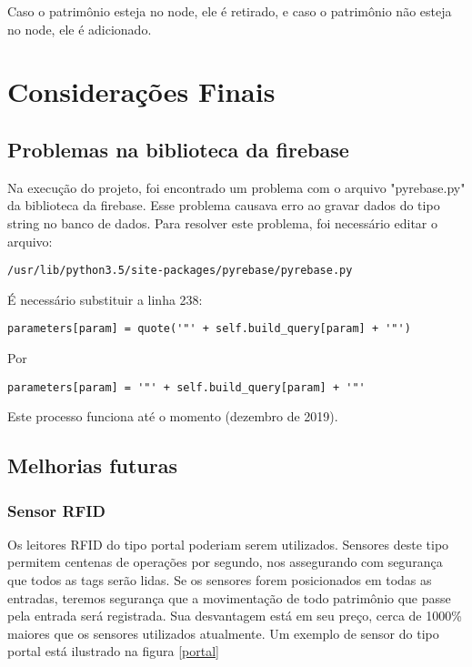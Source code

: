 \documentclass[
	12pt,				%
	openright,			%
	oneside,			%
	a4paper,			%
	english,			%
	french,				%
	spanish,			%
	brazil				%
	]{abntex2}
\begin{document}
Caso o patrimônio esteja no node, ele é retirado, e caso o patrimônio não esteja no node, ele é adicionado.

\chapter{Considerações Finais}

\section{Problemas na biblioteca da firebase}

Na execução do projeto, foi encontrado um problema com o arquivo "pyrebase.py" da biblioteca da firebase. Esse problema causava erro ao gravar dados do tipo string no banco de dados. Para resolver este problema, foi necessário editar o arquivo:

\lstinline{/usr/lib/python3.5/site-packages/pyrebase/pyrebase.py}

É necessário substituir a linha 238:

\lstinline{parameters[param] = quote('"' + self.build_query[param] + '"')}

Por 

\lstinline{parameters[param] = '"' + self.build_query[param] + '"'}

Este processo funciona até o momento (dezembro de 2019).

\section{Melhorias futuras}


\subsection{Sensor RFID}


Os leitores RFID do tipo portal poderiam serem utilizados. Sensores deste tipo permitem centenas de operações por segundo, nos assegurando com segurança que todos as tags serão lidas. Se os sensores forem posicionados em todas as entradas, teremos segurança que a movimentação de todo patrimônio que passe pela entrada será registrada. Sua desvantagem está em seu preço, cerca de 1000\% maiores que os sensores utilizados atualmente. Um exemplo de sensor do tipo portal está ilustrado na figura \ref{portal}

\end{document}
